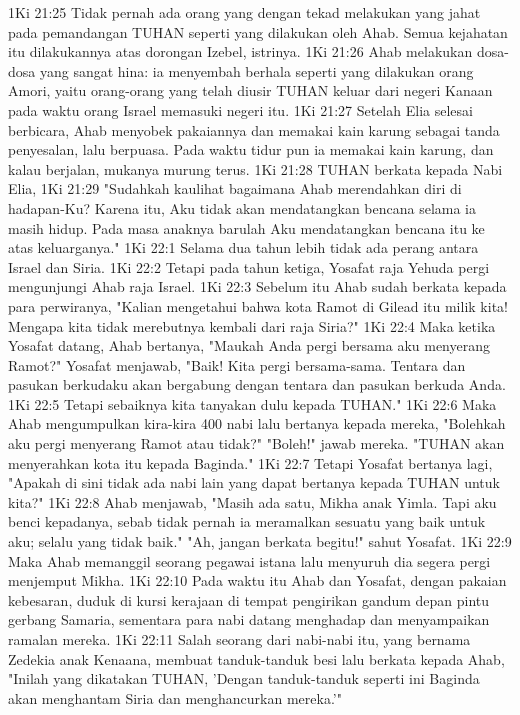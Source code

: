 1Ki 21:25  Tidak pernah ada orang yang dengan tekad melakukan yang jahat pada pemandangan TUHAN seperti yang dilakukan oleh Ahab. Semua kejahatan itu dilakukannya atas dorongan Izebel, istrinya.
1Ki 21:26  Ahab melakukan dosa-dosa yang sangat hina: ia menyembah berhala seperti yang dilakukan orang Amori, yaitu orang-orang yang telah diusir TUHAN keluar dari negeri Kanaan pada waktu orang Israel memasuki negeri itu.
1Ki 21:27  Setelah Elia selesai berbicara, Ahab menyobek pakaiannya dan memakai kain karung sebagai tanda penyesalan, lalu berpuasa. Pada waktu tidur pun ia memakai kain karung, dan kalau berjalan, mukanya murung terus.
1Ki 21:28  TUHAN berkata kepada Nabi Elia,
1Ki 21:29  "Sudahkah kaulihat bagaimana Ahab merendahkan diri di hadapan-Ku? Karena itu, Aku tidak akan mendatangkan bencana selama ia masih hidup. Pada masa anaknya barulah Aku mendatangkan bencana itu ke atas keluarganya."
1Ki 22:1  Selama dua tahun lebih tidak ada perang antara Israel dan Siria.
1Ki 22:2  Tetapi pada tahun ketiga, Yosafat raja Yehuda pergi mengunjungi Ahab raja Israel.
1Ki 22:3  Sebelum itu Ahab sudah berkata kepada para perwiranya, "Kalian mengetahui bahwa kota Ramot di Gilead itu milik kita! Mengapa kita tidak merebutnya kembali dari raja Siria?"
1Ki 22:4  Maka ketika Yosafat datang, Ahab bertanya, "Maukah Anda pergi bersama aku menyerang Ramot?" Yosafat menjawab, "Baik! Kita pergi bersama-sama. Tentara dan pasukan berkudaku akan bergabung dengan tentara dan pasukan berkuda Anda.
1Ki 22:5  Tetapi sebaiknya kita tanyakan dulu kepada TUHAN."
1Ki 22:6  Maka Ahab mengumpulkan kira-kira 400 nabi lalu bertanya kepada mereka, "Bolehkah aku pergi menyerang Ramot atau tidak?" "Boleh!" jawab mereka. "TUHAN akan menyerahkan kota itu kepada Baginda."
1Ki 22:7  Tetapi Yosafat bertanya lagi, "Apakah di sini tidak ada nabi lain yang dapat bertanya kepada TUHAN untuk kita?"
1Ki 22:8  Ahab menjawab, "Masih ada satu, Mikha anak Yimla. Tapi aku benci kepadanya, sebab tidak pernah ia meramalkan sesuatu yang baik untuk aku; selalu yang tidak baik." "Ah, jangan berkata begitu!" sahut Yosafat.
1Ki 22:9  Maka Ahab memanggil seorang pegawai istana lalu menyuruh dia segera pergi menjemput Mikha.
1Ki 22:10  Pada waktu itu Ahab dan Yosafat, dengan pakaian kebesaran, duduk di kursi kerajaan di tempat pengirikan gandum depan pintu gerbang Samaria, sementara para nabi datang menghadap dan menyampaikan ramalan mereka.
1Ki 22:11  Salah seorang dari nabi-nabi itu, yang bernama Zedekia anak Kenaana, membuat tanduk-tanduk besi lalu berkata kepada Ahab, "Inilah yang dikatakan TUHAN, 'Dengan tanduk-tanduk seperti ini Baginda akan menghantam Siria dan menghancurkan mereka.'"
